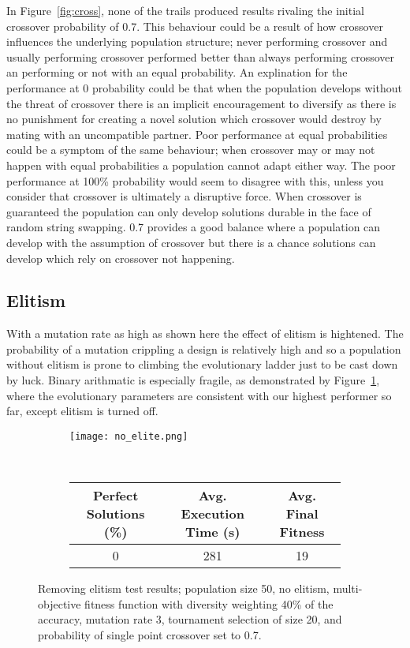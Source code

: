In Figure~\ref{fig:cross}, none of the trails produced results rivaling the
initial crossover probability
of 0.7. This behaviour could be a result of how crossover influences the underlying
population structure; never performing crossover and usually performing crossover
performed better than always performing crossover an performing or not with an equal
probability. An explination for the performance at 0 probability could be that
when the population develops without the threat of crossover there is an implicit
encouragement to diversify as there is no punishment for creating a novel solution
which crossover would destroy by mating with an uncompatible partner. Poor performance
at equal probabilities could be a symptom of the same behaviour; when crossover
may or may not happen with equal probabilities a population cannot adapt either way.
The poor performance at 100\% probability would seem to disagree with this, unless you
consider that crossover is ultimately a disruptive force. When crossover is guaranteed
the population can only develop solutions durable in the face of random string swapping.
0.7 provides a good balance where a population can develop with the assumption of
crossover but there is a chance solutions can develop which rely on crossover not
happening.

\subsection{Elitism \label{ss:elitism}}
With a mutation rate as high as shown here the effect of elitism is hightened.
The probability of a mutation crippling a design is relatively high and so a population
without elitism is prone to climbing the evolutionary ladder just to be cast
down by luck. Binary arithmatic is especially fragile, as demonstrated by Figure~\ref{fig:no_elitism},
where the evolutionary parameters are consistent with our highest performer so far, except
elitism is turned off.

\begin{figure}
	\centering
	\begin{subfigure}[ht]{0.49\textwidth}
		\texttt{[image: no\_elite.png]}
		\vspace{1em}
	\end{subfigure}
	~
	\begin{subfigure}[ht]{\textwidth}
		\centering
		\begin{tabular}{ccc}
			\toprule
			\bfseries{Perfect Solutions (\%)} &
			\bfseries{Avg. Execution Time (s)} & \bfseries{Avg. Final Fitness}\\
			\midrule
			0 & 281 & 19\\
			\bottomrule
		\end{tabular}
	\end{subfigure}

	\caption[Removing elitism test results]{Removing elitism test results;
	population size 50, no elitism, multi-objective fitness function with
	diversity weighting 40\% of the accuracy, mutation rate 3, tournament
	selection of size 20, and probability of single point crossover set to 0.7.}
	\label{fig:no_elitism}
\end{figure}


